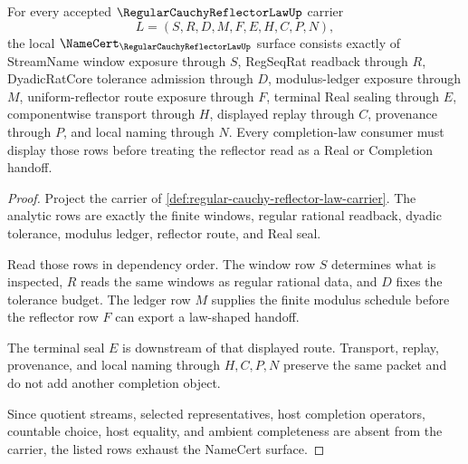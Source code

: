 \begin{theorem}
\label{thm:regular-cauchy-reflector-law-namecert-obligations}
For every accepted $\RegularCauchyReflectorLawUp$ carrier
$$
L=(S,R,D,M,F,E,H,C,P,N),
$$
the local $\NameCert_{\RegularCauchyReflectorLawUp}$ surface consists exactly of StreamName window exposure through $S$, RegSeqRat readback through $R$, DyadicRatCore tolerance admission through $D$, modulus-ledger exposure through $M$, uniform-reflector route exposure through $F$, terminal Real sealing through $E$, componentwise transport through $H$, displayed replay through $C$, provenance through $P$, and local naming through $N$. Every completion-law consumer must display those rows before treating the reflector read as a Real or Completion handoff.
\end{theorem}
\begin{proof}
Project the carrier of \autoref{def:regular-cauchy-reflector-law-carrier}. The analytic rows are exactly the finite windows, regular rational readback, dyadic tolerance, modulus ledger, reflector route, and Real seal.

Read those rows in dependency order. The window row $S$ determines what is inspected, $R$ reads the same windows as regular rational data, and $D$ fixes the tolerance budget. The ledger row $M$ supplies the finite modulus schedule before the reflector row $F$ can export a law-shaped handoff.

The terminal seal $E$ is downstream of that displayed route. Transport, replay, provenance, and local naming through $H,C,P,N$ preserve the same packet and do not add another completion object.

Since quotient streams, selected representatives, host completion operators, countable choice, host equality, and ambient completeness are absent from the carrier, the listed rows exhaust the NameCert surface.
\end{proof}


